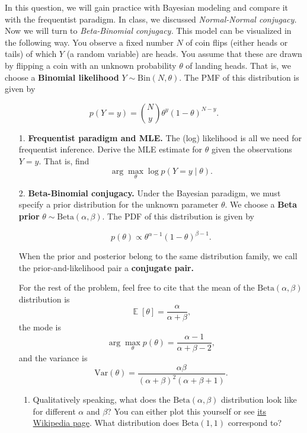 \documentclass[submit]{harvardml}
\DeclareMathOperator*{\mean}{\mathbb{E}}
\begin{document}
\begin{problem}

In this question, we will gain practice with Bayesian modeling and
compare it with the frequentist paradigm.
In class, we discussed \emph{Normal-Normal conjugacy.} Now
we will turn to \emph{Beta-Binomial conjugacy.} This model can be
visualized in the following way.
You observe a fixed number \(N\) of coin flips (either
heads or tails) of which \(Y\) (a random variable) are heads. You assume that these are
drawn by flipping a coin with an unknown probability \(\theta\) of
landing heads. That is, we choose a \textbf{Binomial likelihood}
\(Y \sim \mathrm{Bin}(N, \theta)\). The PMF of this distribution is
given by

\[
  p(Y=y) = {N \choose y} \theta^{y} (1-\theta)^{N-y}.
\]

\begin{enumerate}
  \item[1.]
    \textbf{Frequentist paradigm and MLE.} The (log) likelihood is all we
    need for frequentist inference. Derive the MLE estimate for \(\theta\)
    given the observations \(Y = y\). That is, find
    \[\arg \max_{\theta} \log p(Y = y \mid \theta).\]

  \item[2.]
    \textbf{Beta-Binomial conjugacy.} Under the Bayesian paradigm, we must specify a
    prior distribution for the unknown parameter \(\theta\). We choose a \textbf{Beta prior}
    \(\theta \sim \mathrm{Beta}(\alpha, \beta)\). The PDF of this
    distribution is given by

    \[
      p(\theta) \propto \theta^{\alpha - 1} (1-\theta)^{\beta - 1}.
    \]

    When the prior and posterior belong to the same distribution family, we
    call the prior-and-likelihood pair a \textbf{conjugate pair.}

    For the rest of the problem, feel free to cite that the mean of the \(\mathrm{Beta}(\alpha, \beta)\) distribution is
    \[\mean[\theta] = \frac{\alpha}{\alpha+\beta},\]
    the mode is
    \[\arg\max_\theta p(\theta) = \frac{\alpha-1}{\alpha+\beta-2},\]
    and the variance is
    \[
      \mathrm{Var}(\theta) = \frac{\alpha \beta}{(\alpha + \beta)^2 (\alpha + \beta + 1)}.
    \]

    \begin{enumerate}
      \item
            Qualitatively speaking, what does the $\mathrm{Beta}(\alpha, \beta)$ distribution look like for different $\alpha$ and $\beta$? You can either plot this yourself or see \href{https://en.wikipedia.org/wiki/Beta_distribution}{its Wikipedia page}. What distribution does $\mathrm{Beta}(1, 1)$ correspond to?


\end{enumerate}
\end{enumerate}
\end{problem}
\end{document}
